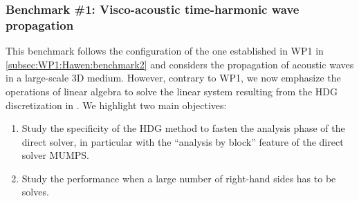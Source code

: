 %

\subsubsection{Benchmark \#1: Visco-acoustic time-harmonic wave propagation}

This benchmark follows the configuration of the one 
established in WP1 in \cref{subsec:WP1:Hawen:benchmark2} and
considers the propagation of acoustic waves in a large-scale 
3D medium.
However, contrary to WP1, we now emphasize the operations 
of linear algebra to solve the linear system resulting from
the HDG discretization in \hawen. 
We highlight two main objectives: 
\begin{enumerate}
\item Study the specificity of the HDG method to fasten the 
      analysis phase of the direct solver, in particular with
      the ``analysis by block'' feature of the direct solver 
      MUMPS.
\item Study the performance when a large number of right-hand 
      sides has to be solves. 
\end{enumerate}



